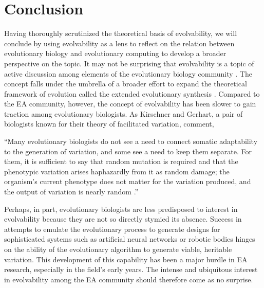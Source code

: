 \chapter{Conclusion} \label{sec:conclusion}

Having thoroughly scrutinized the theoretical basis of evolvability, we will conclude by using evolvability as a lens to reflect on the relation between evolutionary biology and evolutionary computing to develop a broader perspective on the topic. 
It may not be surprising that evolvability is a topic of active discussion among elements of the evolutionary biology community \cite{Pigliucci2008IsEvolvable}.
The concept falls under the umbrella of a broader effort to expand the theoretical framework of evolution called the extended evolutionary synthesis \cite{Pigliucci2007DoSynthesis}.
Compared to the EA community, however, the concept of evolvability has been slower to gain traction among evolutionary biologists.
As Kirschner and Gerhart, a pair of biologists known for their theory of facilitated variation, comment,
\begin{displayquote}
``Many evolutionary biologists do not see a need to connect somatic adaptability to the generation of variation, and some see a need to keep them separate. For them, it is sufficient to say that random mutation is required and that the phenotypic variation arises haphazardly from it as random damage; the organism's current phenotype does not matter for the variation produced, and the output of variation is nearly random \cite[p 219]{Kirschner2005TheDilemma}.''
\end{displayquote}
Perhaps, in part, evolutionary biologists are less predisposed to interest in evolvability because they are not so directly stymied its absence.
Success in attempts to emulate the evolutionary process to generate designs for sophisticated systems such as artificial neural networks or robotic bodies hinges on the ability of the evolutionary algorithm to generate viable, heritable variation.
This development of this capability has been a major hurdle in EA research, especially in the field's early years.
The intense and ubiquitous interest in evolvability among the EA community should therefore come as no surprise.

